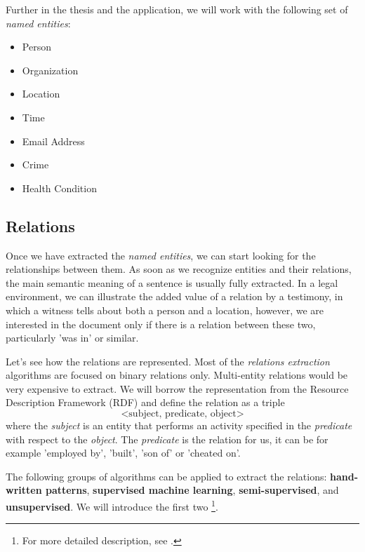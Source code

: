 \documentclass[
  digital, %
  table,   %
  lof,     %
  lot,     %
]{fithesis3}
\begin{document}
Further in the thesis and the application, we will work with the following set of \textit{named entities}:
\begin{itemize}
\item Person
\item Organization
\item Location
\item Time
\item Email Address
\item Crime
\item Health Condition
\end{itemize}

\subsection{Relations}
Once we have extracted the \textit{named entities}, we can start looking for the relationships between them.
As soon as we recognize entities and their relations, the main semantic meaning of a sentence is usually fully extracted.
In a legal environment, we can illustrate the added value of a relation by a testimony, in which a witness tells about both a person and a location, however, we are interested in the document only if there is a relation between these two, particularly 'was in' or similar.

Let's see how the relations are represented.
Most of the \textit{relations extraction} algorithms are focused on binary relations only.
Multi-entity relations would be very expensive to extract.
We will borrow the representation from the Resource Description Framework (RDF) \cite{lassila1999resource} and define the relation as a triple
$$
\text{<subject, predicate, object>}
$$
where the \textit{subject} is an entity that performs an activity specified in the \textit{predicate} with respect to the \textit{object}.
The \textit{predicate} is the relation for us, it can be for example 'employed by', 'built', 'son of' or 'cheated on'.

The following groups of algorithms can be applied to extract the relations: \textbf{hand-written patterns}, \textbf{supervised machine learning}, \textbf{semi-supervised}, and \textbf{unsupervised}.
We will introduce the first two
\footnote{For more detailed description, see  \cite{jurafsky2014speech}.}.
\end{document}
